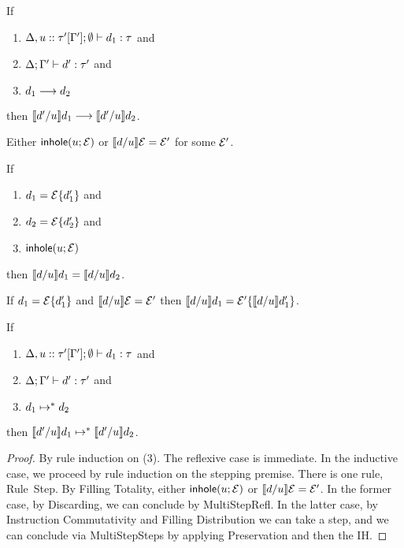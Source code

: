 \begin{lem}
  If 
  \begin{enumerate}[nolistsep]
  	\item $\Delta, u :: \tau'[\Gamma']; \emptyset \vdash d_1 : \tau$ and 
  	\item $\Delta; \Gamma' \vdash d' : \tau'$ and 
  	\item $d_1 \longrightarrow d_2$
  \end{enumerate}

  then $\llbracket d' / u\rrbracket d_1 \longrightarrow \llbracket d' / u\rrbracket d_2$.
\end{lem}

\begin{lem}
Either $\mathsf{inhole}(u; \mathcal{E})$ or $\llbracket d / u\rrbracket \mathcal{E}=\mathcal{E}'$ for some $\mathcal{E}'$.
\end{lem}

\begin{lem}[Discarding] If 
	\begin{enumerate}[nolistsep]
	\item $d_1=\mathcal{E}\{d_1'\}$ and 
	\item $d_2=\mathcal{E}\{d_2'\}$ and 
	\item $\mathsf{inhole}(u; \mathcal{E})$
	\end{enumerate}

	then $\llbracket d / u\rrbracket d_1 = \llbracket d / u\rrbracket d_2$.
\end{lem}

\begin{lem} If 
	$d_1=\mathcal{E}\{d_1'\}$ and $\llbracket d / u\rrbracket \mathcal{E}=\mathcal{E}'$ then $\llbracket d / u\rrbracket d_1=\mathcal{E}'\{\llbracket d / u\rrbracket d_1'\}$.
\end{lem}

\begin{thm}[Commutativity]
  If 
  \begin{enumerate}[nolistsep]
  \item $\Delta, u :: \tau'[\Gamma']; \emptyset \vdash d_1 : \tau$ and 
  \item $\Delta; \Gamma' \vdash d' : \tau'$ and 
  \item $d_1 \mapsto^* d_2$
\end{enumerate}

  then $\llbracket d' / u\rrbracket d_1 \mapsto^* \llbracket d' / u\rrbracket d_2$.
\end{thm}
\begin{proof}
By rule induction on (3). The reflexive case is immediate. In the inductive case, we proceed by rule induction on the stepping premise. There is one rule, Rule~{Step}. By Filling Totality, either $\mathsf{inhole}(u; \mathcal{E})$ or $\llbracket d / u\rrbracket \mathcal{E} = \mathcal{E}'$. In the former case, by Discarding, we can conclude by MultiStepRefl. In the latter case, by Instruction Commutativity and Filling Distribution we can take a step, and we can conclude via MultiStepSteps by applying Preservation and then the IH.
\end{proof}